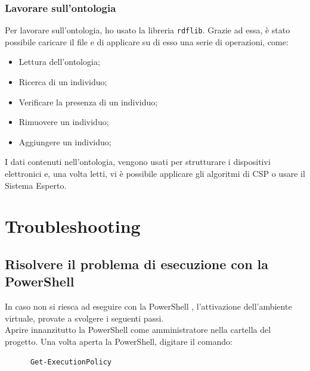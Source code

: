 \documentclass[12pt, letterpaper]{article}
\begin{document}
\subsubsection{Lavorare sull'ontologia}

Per lavorare sull'ontologia, ho usato la libreria \texttt{rdflib}. Grazie ad essa, è stato possibile
caricare il file  e di applicare su di esso una serie di operazioni, come:

\begin{itemize}
      \item Lettura dell'ontologia;
      \item Ricerca di un individuo;
      \item Verificare la presenza di un individuo;
      \item Rimuovere un individuo;
      \item Aggiungere un individuo;
\end{itemize}

\noindent I dati contenuti nell'ontologia, vengono usati per strutturare i dispositivi elettronici e, una volta
letti, vi è possibile applicare gli algoritmi di CSP o usare il Sistema Esperto.


\section{Troubleshooting}

\subsection{Risolvere il problema di esecuzione con la PowerShell}
\label{sec:powershell-error}

In caso non si riesca ad eseguire con la PowerShell \cite{power-shell-resolution},
l'attivazione dell'ambiente virtuale, provate a svolgere i seguenti passi. \\

\noindent Aprire innanzitutto la PowerShell come amministratore nella cartella del progetto.
Una volta aperta la PowerShell, digitare il comando:

\begin{verbatim}
      Get-ExecutionPolicy
\end{verbatim}
\end{document}
